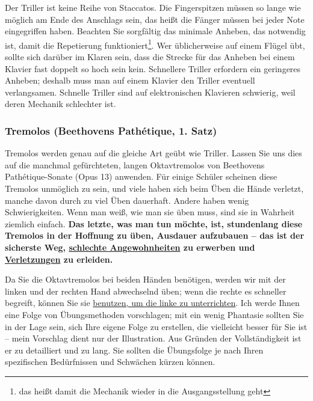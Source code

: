 Der Triller ist keine Reihe von Staccatos.
Die Fingerspitzen müssen so lange wie möglich am Ende des Anschlags sein, das heißt die Fänger müssen bei jeder Note eingegriffen haben.
Beachten Sie sorgfältig das minimale Anheben, das notwendig ist, damit die Repetierung funktioniert\footnote{das heißt damit die Mechanik wieder in die Ausgangsstellung geht}.
Wer üblicherweise auf einem Flügel übt, sollte sich darüber im Klaren sein, dass die Strecke für das Anheben bei einem Klavier fast doppelt so hoch sein kein.
Schnellere Triller erfordern ein geringeres Anheben; deshalb muss man auf einem Klavier den Triller eventuell verlangsamen.
Schnelle Triller sind auf elektronischen Klavieren schwierig, weil deren Mechanik schlechter ist.


\subsubsection{Tremolos (Beethovens Pathétique, 1. Satz)}
\label{c1iii3b}

Tremolos werden genau auf die gleiche Art geübt wie Triller.
Lassen Sie uns dies auf die manchmal gefürchteten, langen Oktavtremolos von Beethovens Pathétique-Sonate (Opus 13) anwenden.
Für einige Schüler scheinen diese Tremolos unmöglich zu sein, und viele haben sich beim Üben die Hände verletzt, manche davon durch zu viel Üben dauerhaft.
Andere haben wenig Schwierigkeiten.
Wenn man weiß, wie man sie üben muss, sind sie in Wahrheit ziemlich einfach.
\textbf{Das letzte, was man tun möchte, ist, stundenlang diese Tremolos in der Hoffnung zu üben, Ausdauer aufzubauen -- das ist der sicherste Weg, \hyperref[c1ii22]{schlechte Angewohnheiten} zu erwerben und \hyperref[c1iii10hand]{Verletzungen} zu erleiden.}

Da Sie die Oktavtremolos bei beiden Händen benötigen, werden wir mit der linken und der rechten Hand abwechselnd üben; wenn die rechte es schneller begreift, können Sie sie \hyperref[c1ii20]{benutzen, um die linke zu unterrichten}.
Ich werde Ihnen eine Folge von Übungsmethoden vorschlagen; mit ein wenig Phantasie sollten Sie in der Lage sein, sich Ihre eigene Folge zu erstellen, die vielleicht besser für Sie ist -- mein Vorschlag dient nur der Illustration.
Aus Gründen der Vollständigkeit ist er zu detailliert und zu lang.
Sie sollten die Übungsfolge je nach Ihren spezifischen Bedürfnissen und Schwächen kürzen können.

